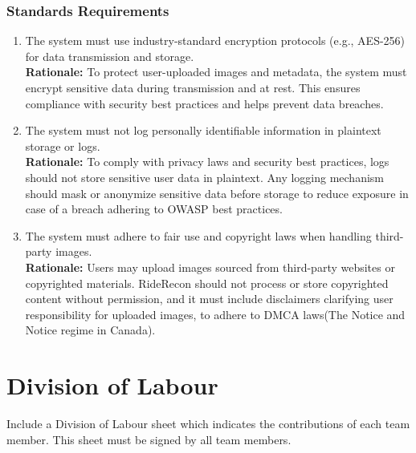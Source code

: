 \documentclass[]{article}
\begin{document}
\subsubsection{Standards Requirements}
\label{ssub:standards_requirements}
\begin{enumerate}[label={LR-STD\arabic*.}]
	\item The system must use industry-standard encryption protocols (e.g., AES-256) for data transmission and storage.\\
   \textbf{Rationale:} To protect user-uploaded images and metadata, the system must encrypt sensitive data during transmission and at rest. This ensures compliance with security best practices and helps prevent data breaches.
   \item The system must not log personally identifiable information in plaintext storage or logs.\\
   \textbf{Rationale:} To comply with privacy laws and security best practices, logs should not store sensitive user data in plaintext. Any logging mechanism should mask or anonymize sensitive data before storage to reduce exposure in case of a breach adhering to OWASP best practices.
   \item The system must adhere to fair use and copyright laws when handling third-party images.\\
   \textbf{Rationale:} Users may upload images sourced from third-party websites or copyrighted materials. RideRecon should not process or store copyrighted content without permission, and it must include disclaimers clarifying user responsibility for uploaded images, to adhere to DMCA laws(The Notice and Notice regime in Canada).

\end{enumerate}


\appendix
\section{Division of Labour}
\label{sec:division_of_labour}
Include a Division of Labour sheet which indicates the contributions of each team member. This sheet must be signed by all team members.
\end{document}
